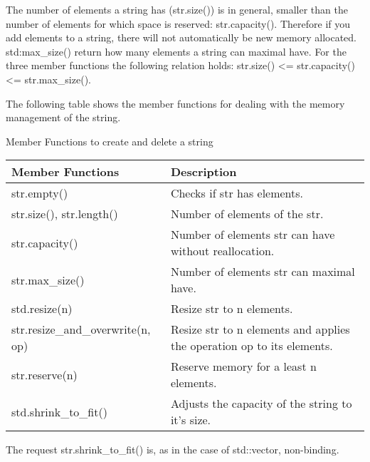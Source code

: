 The number of elements a string has (str.size()) is in general, smaller than the number of elements for which space is reserved: str.capacity(). Therefore if you add elements to a string, there will not automatically be new memory allocated. std:max\_size() return how many elements a string can maximal have. For the three member functions the following relation holds: str.size() <= str.capacity() <= str.max\_size().

The following table shows the member functions for dealing with the memory management of the string.

\begin{center}
Member Functions to create and delete a string
\end{center}


\begin{longtable}[c]{|l|l|}
\hline
\textbf{Member Functions} & \textbf{Description}                                  \\ \hline
\endfirsthead
%
\endhead
%
str.empty()               & Checks if str has elements.                           \\ \hline
str.size(), str.length()  & Number of elements of the str.                        \\ \hline
str.capacity()            & Number of elements str can have without reallocation. \\ \hline
str.max\_size()           & Number of elements str can maximal have.              \\ \hline
std.resize(n)             & Resize str to n elements.                             \\ \hline
str.resize\_and\_overwrite(n, op) & Resize str to n elements and applies the operation op to its elements. \\ \hline
str.reserve(n)            & Reserve memory for a least n elements.                \\ \hline
std.shrink\_to\_fit()     & Adjusts the capacity of the string to it's size.      \\ \hline
\end{longtable}

The request str.shrink\_to\_fit() is, as in the case of std::vector, non-binding.


